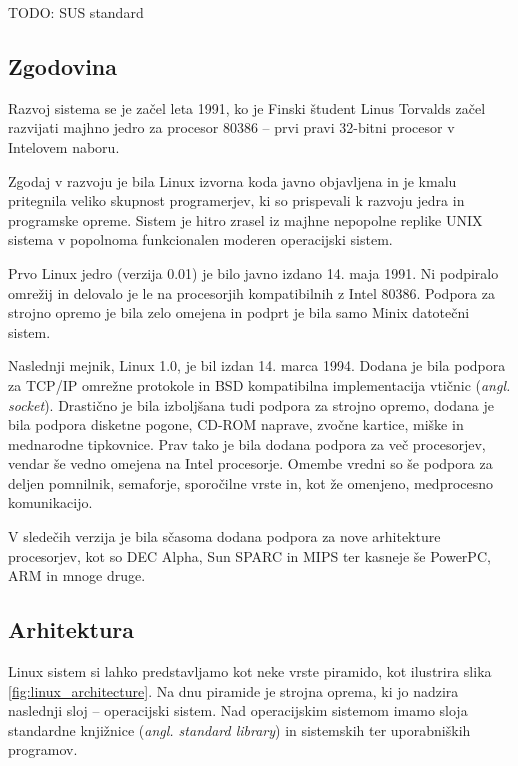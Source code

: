 \documentclass[a4paper,12pt,openright]{book}
\begin{document}
TODO: SUS standard

\subsection{Zgodovina}

Razvoj sistema se je začel leta 1991, ko je Finski študent Linus Torvalds začel razvijati majhno jedro za procesor 80386 -- prvi pravi 32-bitni procesor v Intelovem naboru.

Zgodaj v razvoju je bila Linux izvorna koda javno objavljena in je kmalu pritegnila veliko skupnost programerjev, ki so prispevali k razvoju jedra in programske opreme.
Sistem je hitro zrasel iz majhne nepopolne replike UNIX sistema v popolnoma funkcionalen moderen operacijski sistem.

Prvo Linux jedro (verzija 0.01) je bilo javno izdano 14. maja 1991. Ni podpiralo omrežij in delovalo je le na procesorjih kompatibilnih z Intel 80386.
Podpora za strojno opremo je bila zelo omejena in podprt je bila samo Minix datotečni sistem.

Naslednji mejnik, Linux 1.0, je bil izdan 14. marca 1994. Dodana je bila podpora za TCP/IP omrežne protokole in BSD kompatibilna implementacija vtičnic (\textit{angl. socket}).
Drastično je bila izboljšana tudi podpora za strojno opremo, dodana je bila podpora disketne pogone, CD-ROM naprave, zvočne kartice, miške in mednarodne tipkovnice.
Prav tako je bila dodana podpora za več procesorjev, vendar še vedno omejena na Intel procesorje.
Omembe vredni so še podpora za deljen pomnilnik, semaforje, sporočilne vrste in, kot že omenjeno, medprocesno komunikacijo.

V sledečih verzija je bila sčasoma dodana podpora za nove arhitekture procesorjev, kot so DEC Alpha, Sun SPARC in MIPS ter kasneje še PowerPC, ARM in mnoge druge.
\cite{Silberschatz_Galvin_Gagne_2018}

\subsection{Arhitektura}

Linux sistem si lahko predstavljamo kot neke vrste piramido, kot ilustrira slika \ref{fig:linux_architecture}.
Na dnu piramide je strojna oprema, ki jo nadzira naslednji sloj -- operacijski sistem.
Nad operacijskim sistemom imamo sloja standardne knjižnice (\textit{angl. standard library}) in sistemskih ter uporabniških programov.
\end{document}
